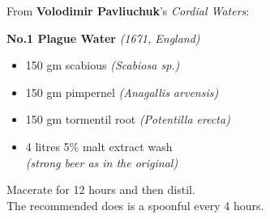 \documentclass[11pt]{report}
\begin{document}
\begin{titlepage}
\begin{multicols}{2}
\raggedcolumns
{}

{
    From \textbf{Volodimir Pavliuchuk}'s \emph{Cordial Waters}:\\
}

\vspace*{2\baselineskip}

{
    \textbf{No.1 Plague Water} \emph{(1671, England)}
    \vspace*{\baselineskip}
    \begin{itemize}
        \renewcommand{\labelitemi}{$\circ$}
        \item 150 gm scabious \emph{(Scabiosa sp.)}
        \item 150 gm pimpernel \emph{(Anagallis arvensis)}
        \item 150 gm tormentil root \emph{(Potentilla erecta)}
        \item 4 litres 5\% malt extract wash\\
            [0.4\baselineskip]
            \emph{(strong beer as in the original)}
    \end{itemize}
    \vspace*{\baselineskip}
    Macerate for 12 hours and then distil.\\
    The recommended does is a spoonful every 4 hours.
}

\vspace*{3.2\baselineskip}


\end{multicols}
\end{titlepage}
\end{document}
